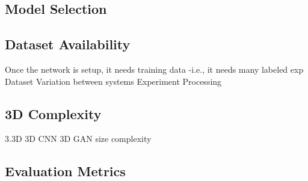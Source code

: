 \subsection{Model Selection}

\subsection{Dataset Availability}
Once the network is setup, it needs training data -i.e., it needs many labeled exp
Dataset
	Variation between systems 
	Experiment
	Processing

\subsection{3D Complexity}
3.3D
3D CNN %
3D GAN size complexity


\subsection{Evaluation Metrics}


